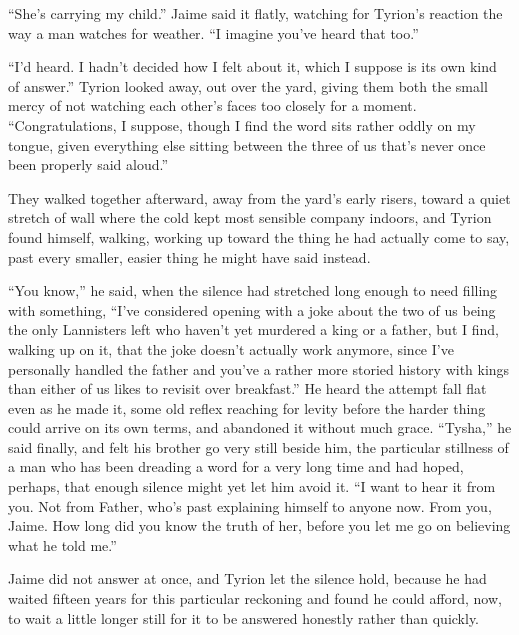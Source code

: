 “She’s carrying my child.” Jaime said it flatly, watching for Tyrion’s reaction the way a man watches for weather. “I imagine you’ve heard that too.”

“I’d heard. I hadn’t decided how I felt about it, which I suppose is its own kind of answer.” Tyrion looked away, out over the yard, giving them both the small mercy of not watching each other’s faces too closely for a moment. “Congratulations, I suppose, though I find the word sits rather oddly on my tongue, given everything else sitting between the three of us that’s never once been properly said aloud.”

\sceneBreak

They walked together afterward, away from the yard’s early risers, toward a quiet stretch of wall where the cold kept most sensible company indoors, and Tyrion found himself, walking, working up toward the thing he had actually come to say, past every smaller, easier thing he might have said instead.

“You know,” he said, when the silence had stretched long enough to need filling with something, “I’ve considered opening with a joke about the two of us being the only Lannisters left who haven’t yet murdered a king or a father, but I find, walking up on it, that the joke doesn’t actually work anymore, since I’ve personally handled the father and you’ve a rather more storied history with kings than either of us likes to revisit over breakfast.” He heard the attempt fall flat even as he made it, some old reflex reaching for levity before the harder thing could arrive on its own terms, and abandoned it without much grace. “Tysha,” he said finally, and felt his brother go very still beside him, the particular stillness of a man who has been dreading a word for a very long time and had hoped, perhaps, that enough silence might yet let him avoid it. “I want to hear it from you. Not from Father, who’s past explaining himself to anyone now. From you, Jaime. How long did you know the truth of her, before you let me go on believing what he told me.”

Jaime did not answer at once, and Tyrion let the silence hold, because he had waited fifteen years for this particular reckoning and found he could afford, now, to wait a little longer still for it to be answered honestly rather than quickly.

